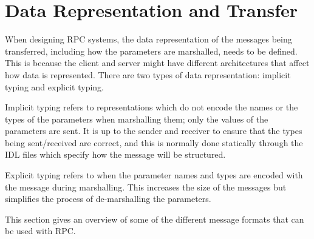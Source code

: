 \section{Data Representation and Transfer} %
\label{sec:data_representation_and_transfer}

When designing RPC systems, the data representation of the messages being transferred, including how the parameters are marshalled, needs to be defined. This is because the client and server might have different architectures that affect how data is represented. There are two types of data representation: implicit typing and explicit typing.

Implicit typing refers to representations which do not encode the names or the types of the parameters when marshalling them; only the values of the parameters are sent. It is up to the sender and receiver to ensure that the types being sent/received are correct, and this is normally done statically through the IDL files which specify how the message will be structured. 

Explicit typing refers to when the parameter names and types are encoded with the message during marshalling. This increases the size of the messages but simplifies the process of de-marshalling the parameters.

This section gives an overview of some of the different message formats that can be used with RPC.



